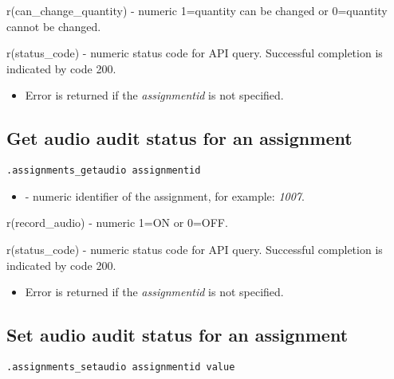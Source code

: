 \savedres
\begin{compactitem}
    \item r(can\_change\_quantity) - numeric 1=quantity can be changed or 0=quantity cannot be changed.
    \item r(status\_code)  - numeric status code for API query. Successful completion is indicated by code 200.
\end{compactitem}

\errheader
\begin{itemize}
    \item Error  is returned if the \textit{assignmentid} is not specified.
\end{itemize}


\subsection{Get audio audit status for an assignment}

\begin{lstlisting}[style=CommandLineStyle]
.assignments_getaudio assignmentid
\end{lstlisting}

\paramsheader
\begin{itemize}
    \item {} - numeric identifier of the assignment, for example: \textit{1007}.
\end{itemize}

\savedres
\begin{compactitem}
    \item r(record\_audio) - numeric 1=ON or 0=OFF.
    \item r(status\_code)  - numeric status code for API query. Successful completion is indicated by code 200.
\end{compactitem}

\errheader
\begin{itemize}
    \item Error  is returned if the \textit{assignmentid} is not specified.
\end{itemize}

\subsection{Set audio audit status for an assignment}

\begin{lstlisting}[style=CommandLineStyle]
.assignments_setaudio assignmentid value
\end{lstlisting}

